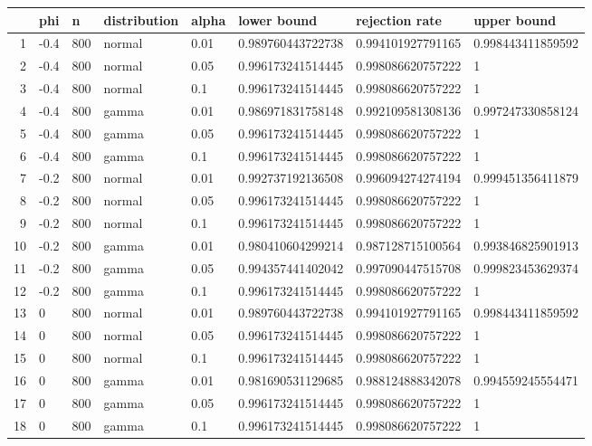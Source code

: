 \begin{table}[ht]
\centering
\begin{tabular}{rlllllll}
  \hline
 & phi & n & distribution & alpha & lower bound & rejection rate & upper bound \\ 
  \hline
1 & -0.4 & 800 & normal & 0.01 & 0.989760443722738 & 0.994101927791165 & 0.998443411859592 \\ 
  2 & -0.4 & 800 & normal & 0.05 & 0.996173241514445 & 0.998086620757222 & 1 \\ 
  3 & -0.4 & 800 & normal & 0.1 & 0.996173241514445 & 0.998086620757222 & 1 \\ 
  4 & -0.4 & 800 & gamma & 0.01 & 0.986971831758148 & 0.992109581308136 & 0.997247330858124 \\ 
  5 & -0.4 & 800 & gamma & 0.05 & 0.996173241514445 & 0.998086620757222 & 1 \\ 
  6 & -0.4 & 800 & gamma & 0.1 & 0.996173241514445 & 0.998086620757222 & 1 \\ 
  7 & -0.2 & 800 & normal & 0.01 & 0.992737192136508 & 0.996094274274194 & 0.999451356411879 \\ 
  8 & -0.2 & 800 & normal & 0.05 & 0.996173241514445 & 0.998086620757222 & 1 \\ 
  9 & -0.2 & 800 & normal & 0.1 & 0.996173241514445 & 0.998086620757222 & 1 \\ 
  10 & -0.2 & 800 & gamma & 0.01 & 0.980410604299214 & 0.987128715100564 & 0.993846825901913 \\ 
  11 & -0.2 & 800 & gamma & 0.05 & 0.994357441402042 & 0.997090447515708 & 0.999823453629374 \\ 
  12 & -0.2 & 800 & gamma & 0.1 & 0.996173241514445 & 0.998086620757222 & 1 \\ 
  13 & 0 & 800 & normal & 0.01 & 0.989760443722738 & 0.994101927791165 & 0.998443411859592 \\ 
  14 & 0 & 800 & normal & 0.05 & 0.996173241514445 & 0.998086620757222 & 1 \\ 
  15 & 0 & 800 & normal & 0.1 & 0.996173241514445 & 0.998086620757222 & 1 \\ 
  16 & 0 & 800 & gamma & 0.01 & 0.981690531129685 & 0.988124888342078 & 0.994559245554471 \\ 
  17 & 0 & 800 & gamma & 0.05 & 0.996173241514445 & 0.998086620757222 & 1 \\ 
  18 & 0 & 800 & gamma & 0.1 & 0.996173241514445 & 0.998086620757222 & 1 \\ 

\end{tabular}
\end{table}
